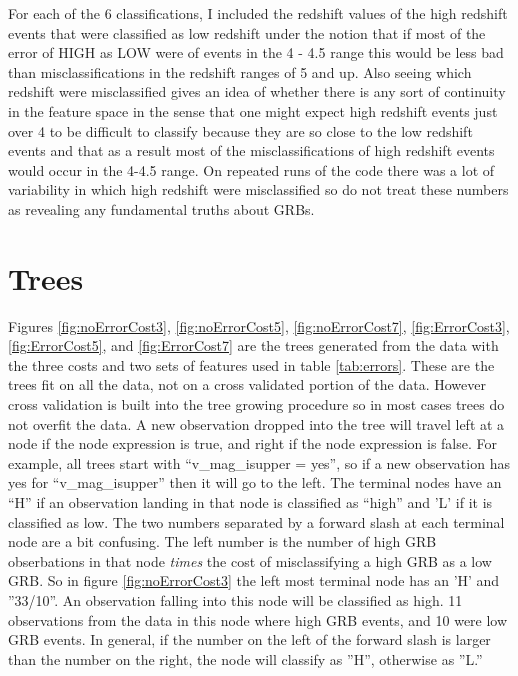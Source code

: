 \documentclass[10pt]{article}
\begin{document}
For each of the 6 classifications, I included the redshift values of the high redshift events that were classified as low redshift under the notion that if most of the error of HIGH as LOW were of events in the 4 - 4.5 range this would be less bad than misclassifications in the redshift ranges of 5 and up. Also seeing which redshift were misclassified gives an idea of whether there is any sort of continuity in the feature space in the sense that one might expect high redshift events just over 4 to be difficult to classify because they are so close to the low redshift events and that as a result most of the misclassifications of high redshift events would occur in the 4-4.5 range. On repeated runs of the code there was a lot of variability in which high redshift were misclassified so do not treat these numbers as revealing any fundamental truths about GRBs.



\section{Trees}
\label{sec:trees}
Figures \ref{fig:noErrorCost3},  \ref{fig:noErrorCost5},  \ref{fig:noErrorCost7}, \ref{fig:ErrorCost3},  \ref{fig:ErrorCost5}, and \ref{fig:ErrorCost7} are the trees generated from the data with the three costs and two sets of features used in table \ref{tab:errors}. These are the trees fit on all the data, not on a cross validated portion of the data. However cross validation is built into the tree growing procedure so in most cases trees do not overfit the data. A new observation dropped into the tree will travel left at a node if the node expression is true, and right if the node expression is false. For example, all trees start with ``v\_mag\_isupper = yes'', so if a new observation has yes for ``v\_mag\_isupper'' then it will go to the left. The terminal nodes have an ``H'' if an observation landing in that node is classified as ``high'' and 'L' if it is classified as low. The two numbers separated by a forward slash at each terminal node are a bit confusing. The left number is the number of high GRB obserbations in that node \textit{times} the cost of misclassifying a high GRB as a low GRB. So in figure \ref{fig:noErrorCost3} the left most terminal node has an 'H' and ''33/10''. An observation falling into this node will be classified as high. 11 observations from the data in this node where high GRB events, and 10 were low GRB events. In general, if the number on the left of the forward slash is larger than the number on the right, the node will classify as ''H'', otherwise as ''L.'' 
\end{document}
